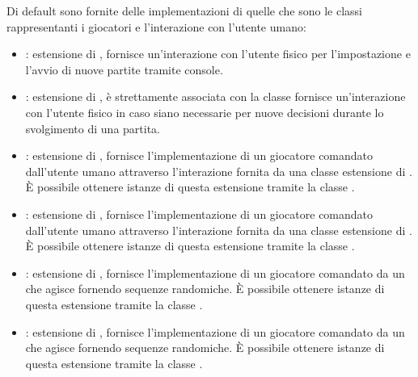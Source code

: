 \documentclass[letterpaper,10pt,italian]{sphinxmanual}
\begin{document}
Di default sono fornite delle implementazioni di quelle che sono le classi rappresentanti i giocatori e l’interazione con l’utente umano:
\begin{itemize}
\item {} 
: estensione di , fornisce un’interazione con l’utente fisico per l’impostazione e l’avvio di nuove partite tramite console.

\item {} 
: estensione di , è strettamente associata con la classe  fornisce un’interazione con l’utente fisico in caso siano necessarie per  nuove decisioni durante lo svolgimento di una partita.

\item {} 
: estensione di , fornisce l’implementazione di un giocatore comandato dall’utente umano attraverso l’interazione fornita da una classe estensione di . È possibile ottenere istanze di questa estensione tramite la classe .

\item {} 
: estensione di , fornisce l’implementazione di un giocatore comandato dall’utente umano attraverso l’interazione fornita da una classe estensione di . È possibile ottenere istanze di questa estensione tramite la classe .

\item {} 
: estensione di , fornisce l’implementazione di un giocatore comandato da un  che agisce fornendo sequenze randomiche. È possibile ottenere istanze di questa estensione tramite la classe .

\item {} 
: estensione di , fornisce l’implementazione di un giocatore comandato da un  che agisce fornendo sequenze randomiche. È possibile ottenere istanze di questa estensione tramite la classe .

\end{itemize}
\end{document}
